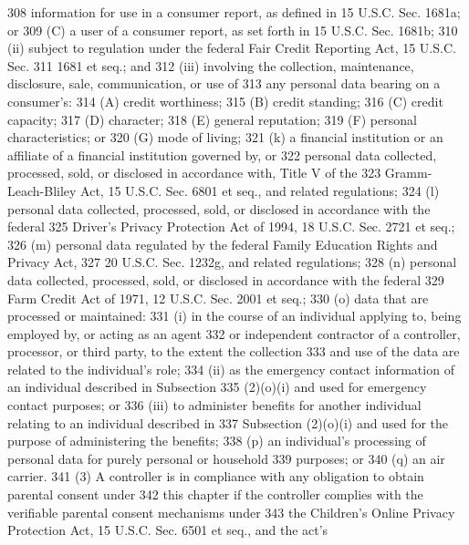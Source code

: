308     information for use in a consumer report, as defined in 15 U.S.C. Sec. 1681a; or
309          (C) a user of a consumer report, as set forth in 15 U.S.C. Sec. 1681b;
310          (ii) subject to regulation under the federal Fair Credit Reporting Act, 15 U.S.C. Sec.
311     1681 et seq.; and
312          (iii) involving the collection, maintenance, disclosure, sale, communication, or use of
313     any personal data bearing on a consumer's:
314          (A) credit worthiness;
315          (B) credit standing;
316          (C) credit capacity;
317          (D) character;
318          (E) general reputation;
319          (F) personal characteristics; or
320          (G) mode of living;
321          (k) a financial institution or an affiliate of a financial institution governed by, or
322     personal data collected, processed, sold, or disclosed in accordance with, Title V of the
323     Gramm-Leach-Bliley Act, 15 U.S.C. Sec. 6801 et seq., and related regulations;
324          (l) personal data collected, processed, sold, or disclosed in accordance with the federal
325     Driver's Privacy Protection Act of 1994, 18 U.S.C. Sec. 2721 et seq.;
326          (m) personal data regulated by the federal Family Education Rights and Privacy Act,
327     20 U.S.C. Sec. 1232g, and related regulations;
328          (n) personal data collected, processed, sold, or disclosed in accordance with the federal
329     Farm Credit Act of 1971, 12 U.S.C. Sec. 2001 et seq.;
330          (o) data that are processed or maintained:
331          (i) in the course of an individual applying to, being employed by, or acting as an agent
332     or independent contractor of a controller, processor, or third party, to the extent the collection
333     and use of the data are related to the individual's role;
334          (ii) as the emergency contact information of an individual described in Subsection
335     (2)(o)(i) and used for emergency contact purposes; or
336          (iii) to administer benefits for another individual relating to an individual described in
337     Subsection (2)(o)(i) and used for the purpose of administering the benefits;
338          (p) an individual's processing of personal data for purely personal or household
339     purposes; or
340          (q) an air carrier.
341          (3) A controller is in compliance with any obligation to obtain parental consent under
342     this chapter if the controller complies with the verifiable parental consent mechanisms under
343     the Children's Online Privacy Protection Act, 15 U.S.C. Sec. 6501 et seq., and the act's
